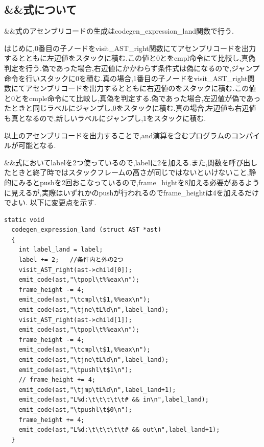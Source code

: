 \documentclass[10pt]{jsarticle}
\begin{document}
\subsection{\&\&式について}
\&\&式のアセンブリコードの生成はcodegen\_expression\_land関数で行う.
\par はじめに,0番目の子ノードをvisit\_AST\_right関数にてアセンブリコードを出力するとともに左辺値をスタックに積む.この値と0とをcmpl命令にて比較し,真偽判定を行う.偽であった場合,右辺値にかかわらず条件式は偽になるので,ジャンプ命令を行いスタックに0を積む.真の場合,1番目の子ノードをvisit\_AST\_right関数にてアセンブリコードを出力するとともに右辺値のをスタックに積む.この値と0とをcmple命令にて比較し,真偽を判定する.偽であった場合,左辺値が偽であったときと同じラベルにジャンプし,0をスタックに積む.真の場合,左辺値も右辺値も真となるので,新しいラベルにジャンプし,1をスタックに積む.
\par 以上のアセンブリコードを出力することで,and演算を含むプログラムのコンパイルが可能となる.\\
\par \&\&式においてlabelを2つ使っているので,labelに2を加える.また,関数を呼び出したときと終了時ではスタックフレームの高さが同じではないといけないこと,静的にみるとpushを2回おこなっているので,frame\_hightを8加える必要があるように見えるが,実際はいずれかのpushが行われるのでframe\_heightは4を加えるだけでよい.
以下に変更点を示す.
\begin{lstlisting}[caption=codegen\_expression\_land]
  static void
  codegen_expression_land (struct AST *ast)
  {
    int label_land = label;
    label += 2;   //条件内と外の2つ
    visit_AST_right(ast->child[0]);
    emit_code(ast,"\tpopl\t%%eax\n");
    frame_height -= 4;
    emit_code(ast,"\tcmpl\t$1,%%eax\n");
    emit_code(ast,"\tjne\tL%d\n",label_land);
    visit_AST_right(ast->child[1]);
    emit_code(ast,"\tpopl\t%%eax\n");
    frame_height -= 4;
    emit_code(ast,"\tcmpl\t$1,%%eax\n");
    emit_code(ast,"\tjne\tL%d\n",label_land);
    emit_code(ast,"\tpushl\t$1\n");
    // frame_height += 4;
    emit_code(ast,"\tjmp\tL%d\n",label_land+1);
    emit_code(ast,"L%d:\t\t\t\t\t# && in\n",label_land);
    emit_code(ast,"\tpushl\t$0\n");
    frame_height += 4;
    emit_code(ast,"L%d:\t\t\t\t\t# && out\n",label_land+1);
  }
\end{lstlisting}
\end{document}

